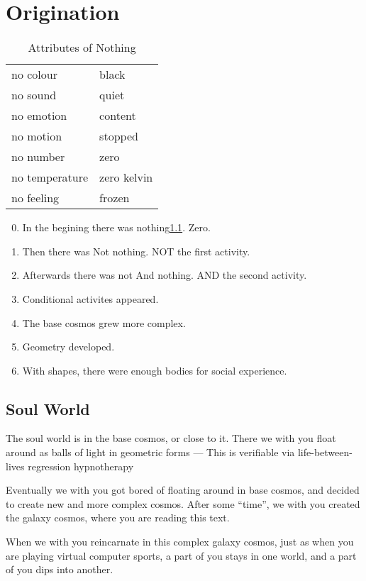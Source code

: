 \documentclass{report}
\begin{document}
\chapter{Origination}
\label{origination}
\begin{table}
\begin{tabular}{l l} 
  no colour & black \\
  no sound & quiet \\
  no emotion & content \\
  no motion & stopped \\
  no number & zero \\
  no temperature & zero kelvin \\
  no feeling & frozen \\
\end{tabular}
\caption{Attributes of Nothing}
\label{nothing}
\end{table}
\begin{enumerate}
\setcounter{enumi}{-1}
\item In the begining there was nothing\ref{nothing}. Zero.
\item Then there was Not nothing. NOT the first activity. 
\item Afterwards there was not And nothing. AND the second activity.
\item Conditional activites appeared. 
\item The base cosmos grew more complex. 
\item Geometry developed. 
\item With shapes, there were enough bodies for social experience.
\end{enumerate}

\section{Soul World}
\label{soulWorld}

The soul world is in the base cosmos, or close to it.
There we with you float around as balls of light in geometric forms ---
This is verifiable via life-between-lives regression
hypnotherapy\cite{newtins}\cite{newton2000destiny}

Eventually we with you got bored of floating around in base cosmos,
and decided to create new and more complex cosmos.
After some ``time'', we with you created the galaxy cosmos, where you are reading this
text.

When we with you reincarnate in this complex galaxy cosmos, just as when you are 
playing virtual computer sports, a part of you stays in one world, and a part
of you dips into another.
\end{document}
